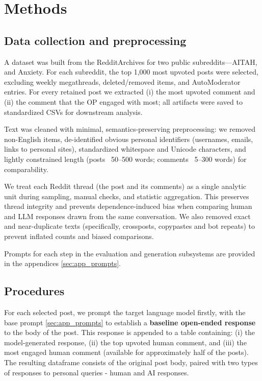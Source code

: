 \section{Methods} \label{sec:Methods}

\subsection{Data collection and preprocessing}
A dataset was built from the RedditArchives for two public subreddits—AITAH, and Anxiety. For each subreddit, the top 1,000 most upvoted posts were selected, excluding weekly megathreads, deleted/removed items, and AutoModerator entries. For every retained post we extracted (i) the most upvoted comment and (ii) the comment that the OP engaged with most; all artifacts were saved to standardized CSVs for downstream analysis.

Text was cleaned with minimal, semantics-preserving preprocessing: we removed non-English items, de-identified obvious personal identifiers (usernames, emails, links to personal sites), standardized whitespace and Unicode characters, and lightly constrained length (posts ~50–500 words; comments ~5–300 words) for comparability. 

We treat each Reddit thread (the post and its comments) as a single analytic unit during sampling, manual checks, and statistic aggregation. This preserves thread integrity and prevents dependence-induced bias when comparing human and LLM responses drawn from the same conversation. We also removed exact and near-duplicate texts (specifically, crossposts, copypastes and bot repeats) to prevent inflated counts and biased comparisons.

\smallskip Prompts for each step in the evaluation and generation subsystems are provided in the appendices \ref{sec:app_prompts}.

\subsection{Procedures}
For each selected post, we prompt the target language model firstly, with the base prompt \ref{sec:app_prompts} to establish a \textbf{baseline open-ended response} to the body of the post. This response is appended to a table containing: (i) the model-generated response, (ii) the top upvoted human comment, and (iii) the most engaged human comment (available for approximately half of the posts). The resulting dataframe consists of the original post body, paired with two types of responses to personal queries - human and AI responses.

